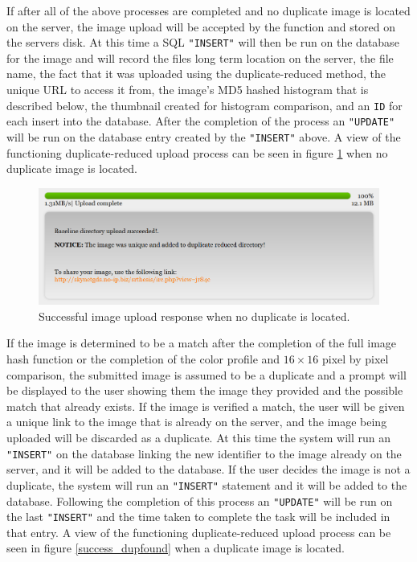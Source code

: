 If after all of the above processes are completed and no duplicate image is located on the server, the image upload will be accepted by the function and stored on the servers disk. At this time a SQL {\tt "INSERT"} will then be run on the database for the image and will record the files long term location on the server, the file name, the fact that it was uploaded using the duplicate-reduced method, the unique URL to access it from, the image's MD5 hashed histogram that is described below, the thumbnail created for histogram comparison, and an {\tt ID} for each insert into the database. After the completion of the process an {\tt "UPDATE"} will be run on the database entry created by the {\tt "INSERT"} above. A view of the functioning duplicate-reduced upload process can be seen in figure \ref{success_nodupfound} when no duplicate image is located.

\begin{figure}[htbp]
\centering
\includegraphics[width=5.5in]{success_nodupfound}
\caption{Successful image upload response when no duplicate is located.}
\label{success_nodupfound}
\end{figure}

If the image is determined to be a match after the completion of the full image hash function or the completion of the color profile and $16\times16$ pixel by pixel comparison, the submitted image is assumed to be a duplicate and a prompt will be displayed to the user showing them the image they provided and the possible match that already exists. If the image is verified a match, the user will be given a unique link to the image that is already on the server, and the image being uploaded will be discarded as a duplicate. At this time the system will run an {\tt "INSERT"} on the database linking the new identifier to the image already on the server, and it will be added to the database. If the user decides the image is not a duplicate, the system will run an {\tt "INSERT"} statement and it will be added to the database. Following the completion of this process an {\tt "UPDATE"} will be run on the last {\tt "INSERT"} and the time taken to complete the task will be included in that entry. A view of the functioning duplicate-reduced upload process can be seen in figure \ref{success_dupfound} when a duplicate image is located.

